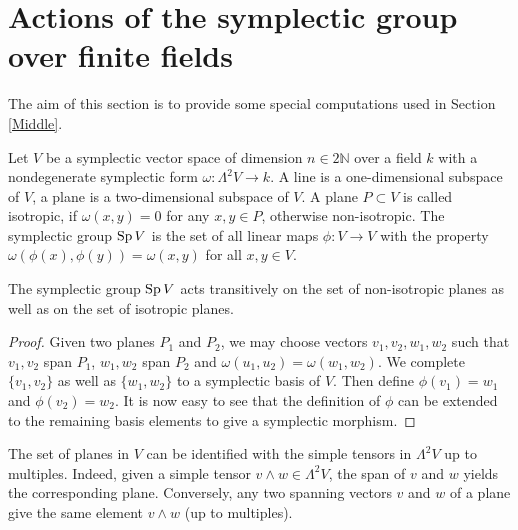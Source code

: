 \section{Actions of the symplectic group over finite fields}\label{Section_Symplectic}
The aim of this section is to provide some special computations used in Section \ref{Middle}.

Let $V$ be a symplectic vector space of dimension $n\in 2\mathbb{N}$ over a field $k$ with a nondegenerate symplectic form $\omega : \Lambda^2 V \rightarrow k$. A line is a one-dimensional subspace of $V$, a plane is a two-dimensional subspace of $V$. A plane $P\subset V$ is called isotropic, if $\omega (x,y)=0$ for any $x,y\in P$, otherwise non-isotropic.  The symplectic group $\operatorname{Sp} V$ is the set of all linear maps $\phi : V\rightarrow V$ with the property $\omega(\phi(x),\phi(y)) = \omega(x,y)$ for all $ x,y\in V$.
\begin{proposition}\label{transitively}
The symplectic group $\operatorname{Sp} V$ acts transitively on the set of non-isotropic planes as well as on the set of isotropic planes.
\end{proposition}
\begin{proof}
Given two planes $P_1$ and $P_2$, we may choose vectors $v_1,v_2,w_1,w_2$ such that $v_1,v_2$ span $P_1$, $w_1,w_2$ span $P_2$ and $\omega(u_1,u_2) =\omega(w_1,w_2)$. We complete $\{v_1,v_2\}$ as well as $\{w_1,w_2\}$ to a symplectic basis of $V$.
Then define $\phi(v_1)=w_1$ and $\phi(v_2)=w_2$. 
It is now easy to see that the definition of $\phi$ can be extended to the remaining basis elements to give a symplectic morphism.
\end{proof}
\begin{remark} \label{simplePlanes}
The set of planes in $V$ can be identified with the simple tensors in $\Lambda^2V$ up to multiples. Indeed, given a simple tensor $v\wedge w \in \Lambda^2 V$, the span of $v$ and $w$ yields the corresponding plane. Conversely, any two spanning vectors $v$ and $w$ of a plane give the same element $v\wedge w$ (up to multiples).
\end{remark}
